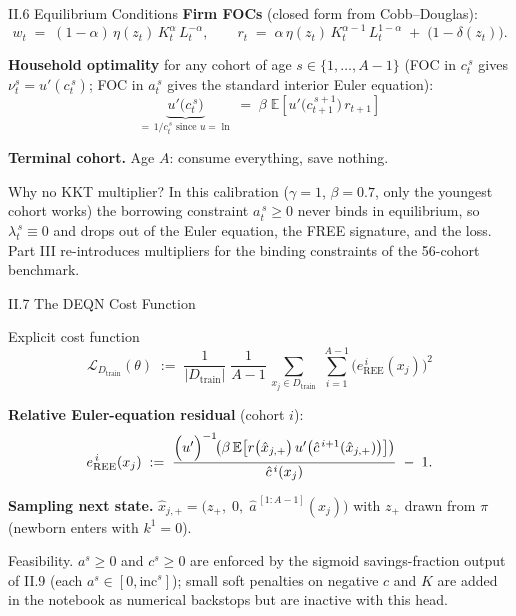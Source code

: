 \documentclass[aspectratio=169,11pt]{beamer}
\newcommand{\emphc}[1]{\textcolor{harvardcrimson}{#1}}
\newcommand{\E}[1]{\mathbb{E}\!\left[#1\right]}
\newcommand{\Loss}{\mathcal{L}}
\begin{document}
\begin{frame}{II.6 Equilibrium Conditions}
\small
\textbf{Firm FOCs} (closed form from Cobb--Douglas):
\[
w_t \;=\; (1-\alpha)\,\eta(z_t)\, K_t^{\alpha}\, L_t^{-\alpha}, \qquad
r_t \;=\; \alpha\,\eta(z_t)\, K_t^{\alpha-1}\, L_t^{1-\alpha} \;+\; \bigl(1-\delta(z_t)\bigr).
\]

\vspace{0.3em}
\textbf{Household optimality} for any cohort of age $s \in \{1, \ldots, A-1\}$ (FOC in $c_t^{\,s}$ gives $\nu_t^s = u'(c_t^{\,s})$; FOC in $a_t^{\,s}$ gives the standard \emphc{interior} Euler equation):
\[
\boxed{\;\underbrace{u'\!\bigl(c_t^{\,s}\bigr)}_{=\,1/c_t^{\,s}\text{ since }u=\ln} \;=\; \beta\;\E{u'\!\bigl(c_{t+1}^{\,s+1}\bigr)\,r_{t+1}}\;}
\]

\vspace{0.3em}
\textbf{Terminal cohort.}  Age $A$: consume everything, save nothing.

\vspace{0.3em}
{\scriptsize \emphc{Why no KKT multiplier?}  In this calibration ($\gamma=1$, $\beta=0.7$, only the youngest cohort works) the borrowing constraint $a_t^{\,s}\ge 0$ never binds in equilibrium, so $\lambda_t^{\,s}\equiv 0$ and drops out of the Euler equation, the FREE signature, and the loss.  Part III re-introduces multipliers for the binding constraints of the 56-cohort benchmark.}
\end{frame}


\begin{frame}{II.7 The DEQN Cost Function}
\small
\begin{block}{Explicit cost function}
\[
\boxed{\;\Loss_{D_{\text{train}}}(\theta) \;:=\; \frac{1}{|D_{\text{train}}|}\;\frac{1}{A-1}\,
\sum_{x_j \in D_{\text{train}}}\;\sum_{i=1}^{A-1} \bigl(e_{\text{REE}}^{\,i}(x_j)\bigr)^2\;}
\]
\end{block}

\vspace{0.3em}
\textbf{Relative Euler-equation residual} (cohort $i$):
\[
e_{\text{REE}}^{\,i}(x_j) \;:=\;
\frac{\Bigl(u'\Bigr)^{-1}\!\!\left(\beta\,\E{r\bigl(\hat x_{j,+}\bigr)\,u'\bigl(\hat c^{\,i+1}(\hat x_{j,+})\bigr)}\right)}{\hat c^{\,i}(x_j)} \;-\; 1.
\]

\textbf{Sampling next state.}  $\hat x_{j,+} = \bigl(z_+,\; 0,\; \hat a^{\,[1:A-1]}(x_j)\bigr)$ with $z_+$ drawn from $\pi$ (newborn enters with $k^1 = 0$).

{\scriptsize \emphc{Feasibility.}  $a^s\ge 0$ and $c^s\ge 0$ are enforced by the sigmoid savings-fraction output of II.9 (each $a^s\in[0,\mathrm{inc}^s]$); small soft penalties on negative $c$ and $K$ are added in the notebook as numerical backstops but are inactive with this head.}
\end{frame}
\end{document}
